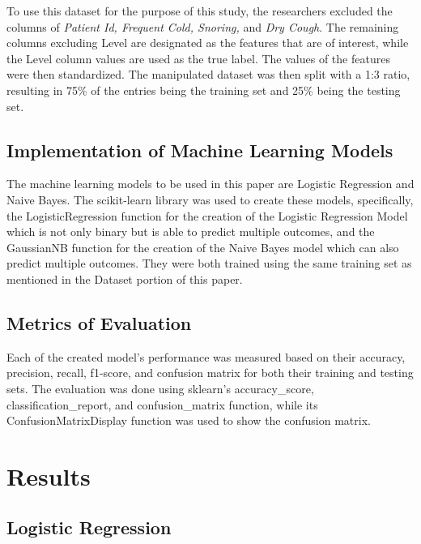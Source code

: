 \documentclass[runningheads]{llncs}
\begin{document}
To use this dataset for the purpose of this study, the researchers excluded the columns of \textit{Patient Id, Frequent Cold, Snoring,} and \textit{Dry Cough}. The remaining columns excluding Level are designated as the features that are of interest, while the Level column values are used as the true label. The values of the features were then standardized. The manipulated dataset was then split with a 1:3 ratio, resulting in 75\% of the entries being the training set and 25\% being the testing set. 

\subsection{Implementation of Machine Learning Models}
The machine learning models to be used in this paper are Logistic Regression and Naive Bayes. The scikit-learn library was used to create these models, specifically, the LogisticRegression function for the creation of the Logistic Regression Model which is not only binary but is able to predict multiple outcomes, and the GaussianNB function for the creation of the Naive Bayes model which can also predict multiple outcomes. They were both trained using the same training set as mentioned in the Dataset portion of this paper.

\subsection{Metrics of Evaluation}
Each of the created model’s performance was measured based on their accuracy, precision, recall, f1-score, and confusion matrix for both their training and testing sets. The evaluation was done using sklearn’s accuracy\_score, classification\_report, and confusion\_matrix function, while its ConfusionMatrixDisplay function was used to show the confusion matrix.

\section{Results}

\subsection{Logistic Regression}
\end{document}
